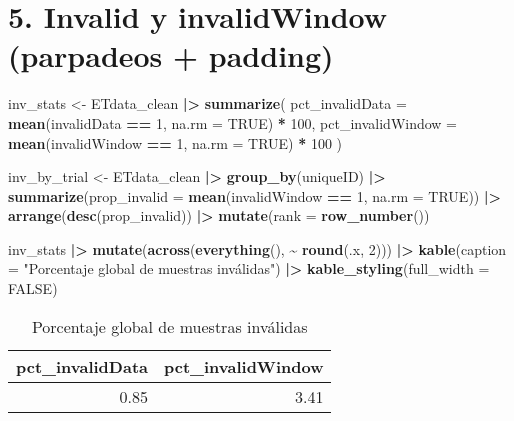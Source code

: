 \documentclass[
]{article}
\newenvironment{Shaded}{\begin{snugshade}}{\end{snugshade}}
\newcommand{\AttributeTok}[1]{\textcolor[rgb]{0.13,0.29,0.53}{#1}}
\newcommand{\ConstantTok}[1]{\textcolor[rgb]{0.56,0.35,0.01}{#1}}
\newcommand{\DecValTok}[1]{\textcolor[rgb]{0.00,0.00,0.81}{#1}}
\newcommand{\FunctionTok}[1]{\textcolor[rgb]{0.13,0.29,0.53}{\textbf{#1}}}
\newcommand{\NormalTok}[1]{#1}
\newcommand{\OtherTok}[1]{\textcolor[rgb]{0.56,0.35,0.01}{#1}}
\newcommand{\SpecialCharTok}[1]{\textcolor[rgb]{0.81,0.36,0.00}{\textbf{#1}}}
\newcommand{\StringTok}[1]{\textcolor[rgb]{0.31,0.60,0.02}{#1}}
\begin{document}
\section{5. Invalid y invalidWindow (parpadeos +
padding)}\label{invalid-y-invalidwindow-parpadeos-padding}

\begin{Shaded}
\begin{Highlighting}[]
\NormalTok{inv\_stats }\OtherTok{\textless{}{-}}\NormalTok{ ETdata\_clean }\SpecialCharTok{|\textgreater{}}
  \FunctionTok{summarize}\NormalTok{(}
    \AttributeTok{pct\_invalidData   =} \FunctionTok{mean}\NormalTok{(invalidData }\SpecialCharTok{==} \DecValTok{1}\NormalTok{, }\AttributeTok{na.rm =} \ConstantTok{TRUE}\NormalTok{) }\SpecialCharTok{*} \DecValTok{100}\NormalTok{,}
    \AttributeTok{pct\_invalidWindow =} \FunctionTok{mean}\NormalTok{(invalidWindow }\SpecialCharTok{==} \DecValTok{1}\NormalTok{, }\AttributeTok{na.rm =} \ConstantTok{TRUE}\NormalTok{) }\SpecialCharTok{*} \DecValTok{100}
\NormalTok{  )}

\NormalTok{inv\_by\_trial }\OtherTok{\textless{}{-}}\NormalTok{ ETdata\_clean }\SpecialCharTok{|\textgreater{}}
  \FunctionTok{group\_by}\NormalTok{(uniqueID) }\SpecialCharTok{|\textgreater{}}
  \FunctionTok{summarize}\NormalTok{(}\AttributeTok{prop\_invalid =} \FunctionTok{mean}\NormalTok{(invalidWindow }\SpecialCharTok{==} \DecValTok{1}\NormalTok{, }\AttributeTok{na.rm =} \ConstantTok{TRUE}\NormalTok{)) }\SpecialCharTok{|\textgreater{}}
  \FunctionTok{arrange}\NormalTok{(}\FunctionTok{desc}\NormalTok{(prop\_invalid)) }\SpecialCharTok{|\textgreater{}}
  \FunctionTok{mutate}\NormalTok{(}\AttributeTok{rank =} \FunctionTok{row\_number}\NormalTok{())}

\NormalTok{inv\_stats }\SpecialCharTok{|\textgreater{}}
  \FunctionTok{mutate}\NormalTok{(}\FunctionTok{across}\NormalTok{(}\FunctionTok{everything}\NormalTok{(), }\SpecialCharTok{\textasciitilde{}} \FunctionTok{round}\NormalTok{(.x, }\DecValTok{2}\NormalTok{))) }\SpecialCharTok{|\textgreater{}}
  \FunctionTok{kable}\NormalTok{(}\AttributeTok{caption =} \StringTok{"Porcentaje global de muestras inválidas"}\NormalTok{) }\SpecialCharTok{|\textgreater{}}
  \FunctionTok{kable\_styling}\NormalTok{(}\AttributeTok{full\_width =} \ConstantTok{FALSE}\NormalTok{)}
\end{Highlighting}
\end{Shaded}

\begin{longtable}[t]{rr}
\caption{\label{tab:unnamed-chunk-6}Porcentaje global de muestras inválidas}\\
\toprule
pct\_invalidData & pct\_invalidWindow\\
\midrule
0.85 & 3.41\\
\bottomrule
\end{longtable}
\end{document}
